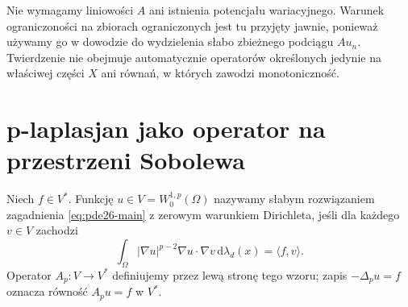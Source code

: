 \begin{uwaga}
Nie wymagamy liniowości $A$ ani istnienia potencjału
wariacyjnego. Warunek ograniczoności na zbiorach
ograniczonych jest tu przyjęty jawnie, ponieważ używamy
go w dowodzie do wydzielenia słabo zbieżnego podciągu $Au_n$.
Twierdzenie nie obejmuje automatycznie operatorów
określonych jedynie na właściwej części $X$ ani równań,
w których zawodzi monotoniczność.
\end{uwaga}

\section{p-laplasjan jako operator na przestrzeni Sobolewa}
\begin{definicja}\label{def:pde26-weak}
Niech $f\in V^*$. Funkcję $u\in V=W_0^{1,p}(\Omega)$
nazywamy słabym rozwiązaniem zagadnienia
\eqref{eq:pde26-main} z zerowym warunkiem Dirichleta,
jeśli dla każdego $v\in V$ zachodzi
\begin{equation}\label{eq:pde26-weak}
 \int_\Omega|\nabla u|^{p-2}\nabla u\cdot\nabla v
 \,\mathrm d\lambda_d(x)=\langle f,v\rangle.
\end{equation}
Operator $A_p:V\to V^*$ definiujemy przez lewą stronę
tego wzoru; zapis $-\Delta_pu=f$ oznacza równość
$A_pu=f$ w $V^*$.
\end{definicja}

